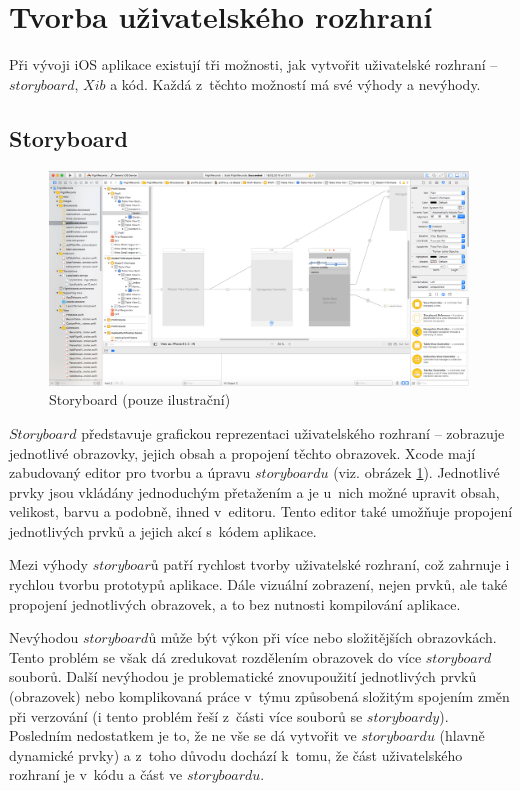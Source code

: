 \documentclass[thesis=M,czech]{FITthesis}[2012/06/26]
\begin{document}
\section{Tvorba uživatelského rozhraní}
Při vývoji iOS aplikace existují tři možnosti, jak vytvořit uživatelské rozhraní -- $storyboard$, $Xib$ a kód. Každá z~těchto možností má své výhody a nevýhody. \cite{iOSUI}

\subsection{Storyboard}

\begin{figure}[]\centering
 \includegraphics[width=0.99\textwidth]{./pictures/storyboard}
 \caption[Storyboard]{Storyboard (pouze ilustrační)}\label{fig:SB}
\end{figure}

$Storyboard$ představuje grafickou reprezentaci uživatelského rozhraní -- zobrazuje jednotlivé obrazovky, jejich obsah a propojení těchto obrazovek. Xcode mají zabudovaný editor pro tvorbu a úpravu $storyboardu$ (viz. obrázek \ref{fig:SB}). Jednotlivé prvky jsou vkládány jednoduchým přetažením a je u~nich možné upravit obsah, velikost, barvu a podobně, ihned v~editoru. Tento editor také umožňuje propojení jednotlivých prvků a jejich akcí s~kódem aplikace. \cite{SB}

Mezi výhody $storyboarů$ patří rychlost tvorby uživatelské rozhraní, což zahrnuje i rychlou tvorbu prototypů aplikace. Dále vizuální zobrazení, nejen prvků, ale také propojení jednotlivých obrazovek, a to bez nutnosti kompilování aplikace. 

Nevýhodou $storyboardů$ může být výkon při více nebo složitějších obrazovkách. Tento problém se však dá zredukovat rozdělením obrazovek do více $storyboard$ souborů. Další nevýhodou je problematické znovupoužití jednotlivých prvků (obrazovek) nebo komplikovaná práce v~týmu způsobená složitým spojením změn při verzování (i tento problém řeší z~části více souborů se $storyboardy$). Posledním nedostatkem je to, že ne vše se dá vytvořit ve $storyboardu$ (hlavně dynamické prvky) a z~toho důvodu dochází k~tomu, že část uživatelského rozhraní je v~kódu a část ve $storyboardu$. \cite{iOSUI} \cite{dominik}
\end{document}

